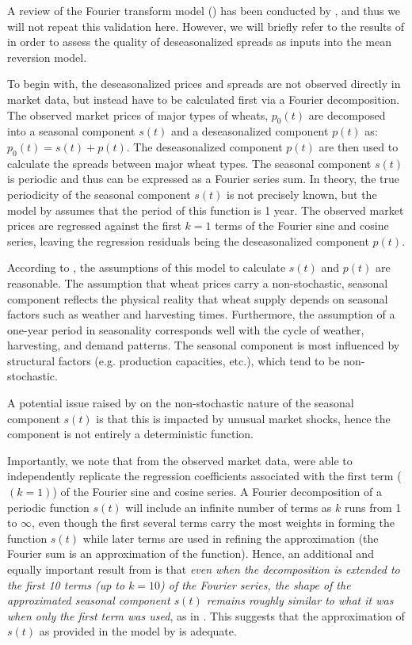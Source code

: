 \documentclass{article}
\begin{document}
	A review of the Fourier transform model (\cite{ken93}) has been conducted by \cite{wang12}, and thus we will not repeat this validation here. However, we will briefly refer to the results of \cite{wang12} in order to assess the quality of deseasonalized spreads as inputs into the mean reversion model.

	To begin with, the deseasonalized prices and spreads are not observed directly in market data, but instead have to be calculated first via a Fourier decomposition. The observed market prices of major types of wheats, $p_0(t)$ are decomposed into a seasonal component $s(t)$ and a deseasonalized component $p(t)$ as: $p_0(t) = s(t) + p(t)$. The deseasonalized component $p(t)$ are then used to calculate the spreads between major wheat types. The seasonal component $s(t)$ is periodic and thus can be expressed as a Fourier series sum. In theory, the true periodicity of the seasonal component $s(t)$ is not precisely known, but the model by \cite{ken93} assumes that the period of this function is 1 year. The observed market prices are regressed against the first $k=1$ terms of the Fourier sine and cosine series, leaving the regression residuals being the deseasonalized component $p(t)$. 

	According to \cite{wang12}, the assumptions of this model to calculate $s(t)$ and $p(t)$ are reasonable. The assumption that wheat prices carry a non-stochastic, seasonal component reflects the physical reality that wheat supply depends on seasonal factors such as weather and harvesting times. Furthermore, the assumption of a one-year period in seasonality corresponds well with the cycle of weather, harvesting, and demand patterns. The seasonal component is most influenced by structural factors (e.g. production capacities, etc.), which tend to be non-stochastic.

	A potential issue raised by \cite{wang12} on the non-stochastic nature of the seasonal component $s(t)$ is that this is impacted by unusual market shocks, hence the component is not entirely a deterministic function. 

	Importantly, we note that from the observed market data, \cite{wang12} were able to independently replicate the regression coefficients associated with the first term ($(k=1)$) of the Fourier sine and cosine series. A Fourier decomposition of a periodic function $s(t)$ will include an infinite number of terms as $k$ runs from 1 to $\infty$, even though the first several terms carry the most weights in forming the function $s(t)$ while later terms are used in refining the approximation (the Fourier sum is an approximation of the function). Hence, an additional and equally important result from \cite{wang12} is that \textit{even when the decomposition is extended to the first 10 terms (up to $k=10$) of the Fourier series, the shape of the approximated seasonal component $s(t)$ remains roughly similar to what it was when only the first term was used}, as in \cite{ken93}. This suggests that the approximation of $s(t)$ as provided in the model by \cite{ken93} is adequate.	
\end{document}
